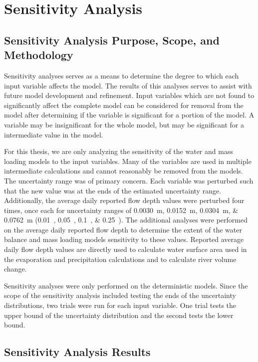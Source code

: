 \chapter{Sensitivity Analysis}
\label{chap:SensitivityAnalysis}

\section{Sensitivity Analysis Purpose, Scope, and Methodology}
\label{sec:PurposeAndScope}

Sensitivity analyses serves as a means to determine the degree to which each input variable affects the model.  The results of this analyses serves to assist with future model development and refinement.  Input variables which are not found to significantly affect the complete model can be considered for removal from the model after determining if the variable is significant for a portion of the model.  A variable may be insignificant for the whole model, but may be significant for a intermediate value in the model.

For this thesis, we are only analyzing the sensitivity of the water and mass loading models to the input variables.  Many of the variables are used in multiple intermediate calculations and cannot reasonably be removed from the models.  The uncertainty range was of primary concern.  Each variable was perturbed such that the new value was at the ends of the estimated uncertainty range.  Additionally, the average daily reported flow depth values were perturbed four times, once each for uncertainty ranges of \SIlist{0.0030;0.0152;0.0304;0.0762}{\meter} (\SIlist{0.01;0.05;0.1;0.25}{\foot}).  The additional analyses were performed on the average daily reported flow depth to determine the extent of the water balance and mass loading models sensitivity to these values.  Reported average daily flow depth values are directly used to calculate water surface area used in the evaporation and precipitation calculations and to calculate river volume change.

Sensitivity analyses were only performed on the deterministic models.   Since the scope of the sensitivity analysis included testing the ends of the uncertainty distributions, two trials were run for each input variable.  One trial tests the upper bound of the uncertainty distribution and the second tests the lower bound.

\section{Sensitivity Analysis Results}
\label{sec:SAResults}

